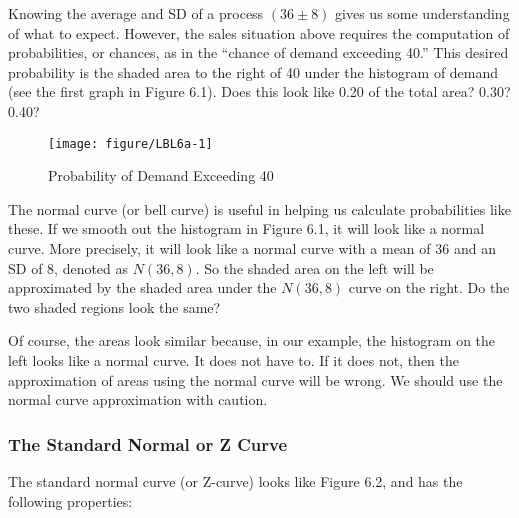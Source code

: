 \documentclass[11pt]{book}\usepackage[]{graphicx}\usepackage[]{color}
\begin{document}
Knowing the average and SD of a process $(36 \pm 8)$ gives us some understanding of what to expect.  However, the sales situation above requires the computation of probabilities, or chances, as in the ``chance of demand exceeding 40.''   This desired probability is the shaded area to the right of 40 under the histogram of demand (see the first graph in Figure 6.1).  Does this look like 0.20 of the total area?  0.30?  0.40?

\begin{figure}[ht]
\caption{Probability of Demand Exceeding 40}



{\centering \texttt{[image: figure/LBL6a-1]} 

}



\end{figure}

The normal curve (or bell curve) is useful in helping us calculate probabilities like these.  If we smooth out the histogram in Figure 6.1, it will look like a normal curve.  More precisely, it will look like a normal curve with a mean of 36 and an SD of 8, denoted as $N(36, 8)$.  So the shaded area on the left will be approximated by the shaded area under the $N(36, 8)$ curve on the right.  Do the two shaded regions look the same?

Of course, the areas look similar because, in our example, the histogram on the left looks like a normal curve.  It does not have to.  If it does not, then the approximation of areas using the normal curve will be wrong.  We should use the normal curve approximation with caution.

\subsubsection{The Standard Normal or Z Curve}

The standard normal curve (or Z-curve) looks like Figure 6.2, and has the following properties:

\begin{center}
\end{center}
\end{document}
